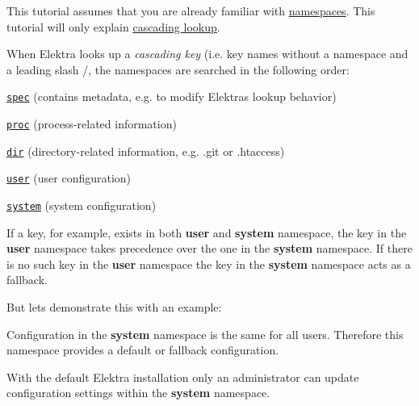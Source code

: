 This tutorial assumes that you are already familiar with \hyperlink{doc_tutorials_namespaces_md}{namespaces}. This tutorial will only explain \hyperlink{doc_help_elektra-cascading_md}{cascading lookup}.

When Elektra looks up a {\itshape cascading key} (i.\+e. key names without a namespace and a leading slash {\ttfamily /}, the namespaces are searched in the following order\+:


\begin{DoxyItemize}
\item \href{https://github.com/ElektraInitiative/libelektra/blob/master/doc/help/elektra-namespaces.md#spec}{\tt spec} (contains metadata, e.\+g. to modify Elektra\textquotesingle{}s lookup behavior)
\item \href{https://github.com/ElektraInitiative/libelektra/blob/master/doc/help/elektra-namespaces.md#proc}{\tt proc} (process-\/related information)
\item \href{https://github.com/ElektraInitiative/libelektra/blob/master/doc/help/elektra-namespaces.md#dir}{\tt dir} (directory-\/related information, e.\+g. {\ttfamily .git} or {\ttfamily .htaccess})
\item \href{https://github.com/ElektraInitiative/libelektra/blob/master/doc/help/elektra-namespaces.md#user}{\tt user} (user configuration)
\item \href{https://github.com/ElektraInitiative/libelektra/blob/master/doc/help/elektra-namespaces.md#system}{\tt system} (system configuration)
\end{DoxyItemize}

If a key, for example, exists in both {\bfseries user} and {\bfseries system} namespace, the key in the {\bfseries user} namespace takes precedence over the one in the {\bfseries system} namespace. If there is no such key in the {\bfseries user} namespace the key in the {\bfseries system} namespace acts as a fallback.

But lets demonstrate this with an example\+:

Configuration in the {\bfseries system} namespace is the same for all users. Therefore this namespace provides a default or fallback configuration.

With the default Elektra installation only an administrator can update configuration settings within the {\bfseries system} namespace.




